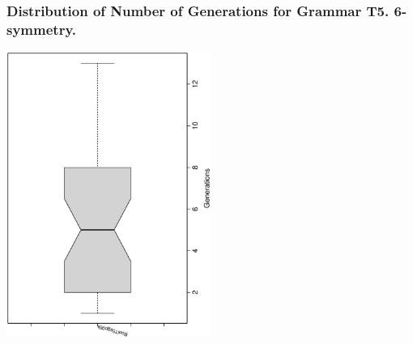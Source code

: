  \begin{frame}
 \frametitle{ Distribution of Number of Generations for Grammar T5. 6-symmetry. }
 \begin{center}
\includegraphics[width=0.5\textwidth, angle=-90]
{ExpFboxplottGenerations004.eps}
 \end{center}
 \label{ExpFboxplottGenerations004.eps}  
 \end{frame}

